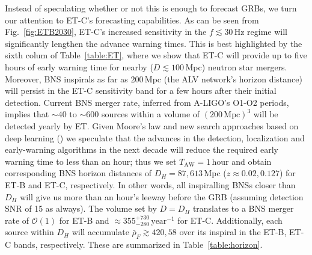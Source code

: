 \documentclass[amsmath,amssymb,aps,floats,amsfonts,notitlepage,superscriptaddress,eqsecnum,nofootinbib,10pt]{revtex4-1}
\begin{document}
Instead of speculating whether or not this is enough to forecast GRBs, we turn our attention to ET-C's forecasting capabilities.
As can be seen from Fig.~\ref{fig:ETB2030}, ET-C's increased sensitivity in the $f\lesssim 30\,$Hz regime will significantly lengthen the advance warning times.
This is best highlighted by the sixth colum of Table~\ref{table:ET}, 
where we show that ET-C will provide up to five hours of early warning time for nearby ($D\lesssim 100\,$Mpc) neutron star mergers.
Moreover, BNS inspirals as far as 200\,Mpc (the ALV network's horizon distance) will persist in the ET-C sensitivity band for a few hours after their initial detection.
Current BNS merger rate, inferred from A-LIGO's O1-O2 periods, implies that $\sim 40$ to $\sim600$ sources within a volume of $(200\,\text{Mpc})^3$ will be detected yearly by ET.
Given Moore's law and new search approaches based on deep learning (\cite{Gabbard:2017lja}) we speculate
that the advances in the detection, localization and early-warning algorithms in the next decade will reduce the required early
warning time to less than an hour; thus we set $T_\text{AW} = 1\,\text{hour}$ and obtain corresponding BNS horizon distances of $D_H=87,613\,$Mpc ($z\approx 0.02,0.127$) for ET-B and ET-C, respectively.
In other words, all inspiralling BNSs closer than $D_H$ will give us more than an hour's leeway before the GRB (assuming detection SNR of 15 as always).
The volume set by $D=D_H$ translates to a BNS merger rate of $\mathcal{O}(1)$ for ET-B and
$\approx 355^{+730}_{-280}\,\text{year}^{-1}$ for ET-C. Additionally, each source within $D_H$ will accumulate $\bar\rho_F \gtrsim 420, 58$ over its inspiral
in the ET-B, ET-C bands, respectively. These are summarized in Table~\ref{table:horizon}.
\end{document}
